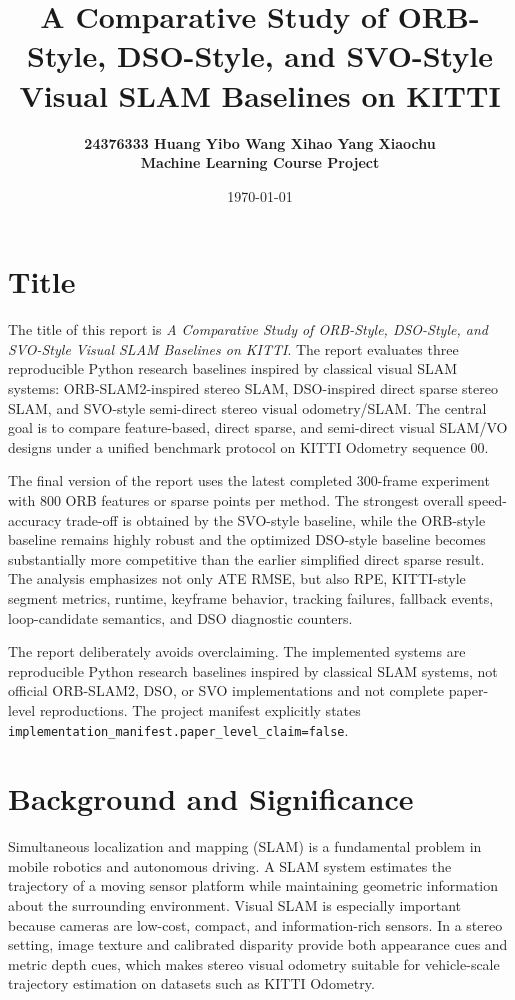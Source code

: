 \documentclass[11pt,a4paper]{article}
\title{A Comparative Study of ORB-Style, DSO-Style, and SVO-Style Visual SLAM Baselines on KITTI}
\author{\large\bfseries 24376333 Huang Yibo \quad 24376267 Wang Xihao \quad 24301017 Yang Xiaochu\\[0.3em]
Machine Learning Course Project}
\date{\today}
\newcommand{\paperclaim}{\texttt{implementation\_manifest.paper\_level\_claim=false}}
\newcommand{\methodorb}{ORB-SLAM2-inspired stereo SLAM}
\newcommand{\methoddso}{DSO-inspired direct sparse stereo SLAM}
\newcommand{\methodsvo}{SVO-style semi-direct stereo visual odometry/SLAM}
\begin{document}
\maketitle

\section{Title}

The title of this report is \emph{A Comparative Study of ORB-Style, DSO-Style, and SVO-Style Visual SLAM Baselines on KITTI}. The report evaluates three reproducible Python research baselines inspired by classical visual SLAM systems: \methodorb{}, \methoddso{}, and \methodsvo{}. The central goal is to compare feature-based, direct sparse, and semi-direct visual SLAM/VO designs under a unified benchmark protocol on KITTI Odometry sequence 00.

The final version of the report uses the latest completed 300-frame experiment with 800 ORB features or sparse points per method. The strongest overall speed-accuracy trade-off is obtained by the SVO-style baseline, while the ORB-style baseline remains highly robust and the optimized DSO-style baseline becomes substantially more competitive than the earlier simplified direct sparse result. The analysis emphasizes not only ATE RMSE, but also RPE, KITTI-style segment metrics, runtime, keyframe behavior, tracking failures, fallback events, loop-candidate semantics, and DSO diagnostic counters.

The report deliberately avoids overclaiming. The implemented systems are reproducible Python research baselines inspired by classical SLAM systems, not official ORB-SLAM2, DSO, or SVO implementations and not complete paper-level reproductions. The project manifest explicitly states \paperclaim{}.

\section{Background and Significance}

Simultaneous localization and mapping (SLAM) is a fundamental problem in mobile robotics and autonomous driving. A SLAM system estimates the trajectory of a moving sensor platform while maintaining geometric information about the surrounding environment. Visual SLAM is especially important because cameras are low-cost, compact, and information-rich sensors. In a stereo setting, image texture and calibrated disparity provide both appearance cues and metric depth cues, which makes stereo visual odometry suitable for vehicle-scale trajectory estimation on datasets such as KITTI Odometry.
\end{document}
